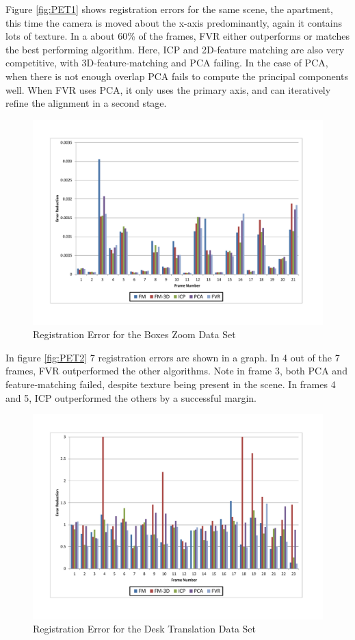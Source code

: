 Figure \ref{fig:PET1} shows registration errors for the same scene, the apartment, this time the camera is moved about the x-axis predominantly, again it contains lots of texture. In a about 60\% of the frames, FVR either outperforms or matches the best performing algorithm. Here, ICP and 2D-feature matching are also very competitive, with 3D-feature-matching and PCA failing. In the case of PCA, when there is not enough overlap PCA fails to compute the principal components well. When FVR uses PCA, it only uses the primary axis, and can iteratively refine the alignment in a second stage.

\begin{figure}[t]
\centering
\includegraphics[width=6.0in]{images/results/Boxes_Texture_ZoomOut}
\caption{Registration Error for the Boxes Zoom Data Set}
\label{fig:PET3}
\end{figure}

In figure \ref{fig:PET2} 7 registration errors are shown in a graph. In 4 out of the 7 frames, FVR outperformed the other algorithms. Note in frame 3, both PCA and feature-matching failed, despite texture being present in the scene. In frames 4 and 5, ICP outperformed the others by a successful margin. 

\begin{figure}[t]
\centering
\includegraphics[width=6.0in]{images/results/Desk_Texture_Translation}
\caption{Registration Error for the Desk Translation Data Set}
\label{fig:PET4}
\end{figure}

